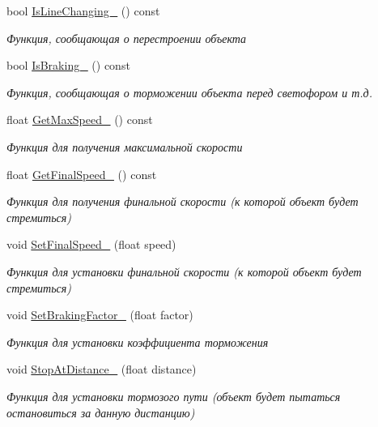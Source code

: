 \begin{DoxyCompactItemize}
bool \hyperlink{classrtm_1_1_vehicle_object_a464c8de22beb3cbf819d12ad36ae4974}{Is\+Line\+Changing\+\_\+} () const
\begin{DoxyCompactList}\small\item\em Функция, сообщающая о перестроении объекта \end{DoxyCompactList}\item 
bool \hyperlink{classrtm_1_1_vehicle_object_ab74eb10fd7df8238a437923cbf184bca}{Is\+Braking\+\_\+} () const
\begin{DoxyCompactList}\small\item\em Функция, сообщающая о торможении объекта перед светофором и т.\+д. \end{DoxyCompactList}\item 
float \hyperlink{classrtm_1_1_vehicle_object_ad0dd345b8c1d7913034aaf3267ee4a03}{Get\+Max\+Speed\+\_\+} () const
\begin{DoxyCompactList}\small\item\em Функция для получения максимальной скорости \end{DoxyCompactList}\item 
float \hyperlink{classrtm_1_1_vehicle_object_a6cf4eb12c1eaf80b7f1e95ab206deae9}{Get\+Final\+Speed\+\_\+} () const
\begin{DoxyCompactList}\small\item\em Функция для получения финальной скорости (к которой объект будет стремиться) \end{DoxyCompactList}\item 
void \hyperlink{classrtm_1_1_vehicle_object_a0339478b106ebe22b63a6d076204cc22}{Set\+Final\+Speed\+\_\+} (float speed)
\begin{DoxyCompactList}\small\item\em Функция для установки финальной скорости (к которой объект будет стремиться) \end{DoxyCompactList}\item 
void \hyperlink{classrtm_1_1_vehicle_object_a3c2db832bf74ea5bd226e98e24b3da4b}{Set\+Braking\+Factor\+\_\+} (float factor)
\begin{DoxyCompactList}\small\item\em Функция для установки коэффициента торможения \end{DoxyCompactList}\item 
void \hyperlink{classrtm_1_1_vehicle_object_a124909b0d2443d501d9b1eb8d359ad5a}{Stop\+At\+Distance\+\_\+} (float distance)
\begin{DoxyCompactList}\small\item\em Функция для установки тормозого пути (объект будет пытаться остановиться за данную дистанцию) \end{DoxyCompactList}\end{DoxyCompactItemize}

